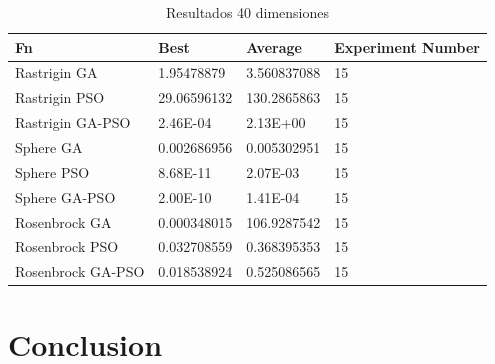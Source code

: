 \documentclass[runningheads]{llncs}
\begin{document}
            \begin{table}[htp]
              \caption{Resultados 40 dimensiones}
              \label{table:resultados-2}
              \centering
              \begin{tabular}{|l|l|l|l|}
              \hline
              Fn & Best & Average & Experiment Number \\
              \hline
              \hline
              Rastrigin GA & 1.95478879 & 3.560837088 & 15\\
              \hline
              Rastrigin PSO & 29.06596132 & 130.2865863 & 15\\
              \hline
              Rastrigin GA-PSO & 2.46E-04 & 2.13E+00 & 15\\
              \hline
              Sphere GA & 0.002686956 & 0.005302951 & 15\\
              \hline
              Sphere PSO & 8.68E-11 & 2.07E-03 & 15\\
              \hline
              Sphere GA-PSO & 2.00E-10 & 1.41E-04 & 15\\
              \hline
              Rosenbrock GA & 0.000348015 & 106.9287542 & 15\\
              \hline
              Rosenbrock PSO & 0.032708559 & 0.368395353 & 15\\
              \hline
              Rosenbrock GA-PSO & 0.018538924 & 0.525086565 & 15\\
              \hline
              \end{tabular}
              \end{table}
%
%
% 
% 
%
\section{Conclusion}
\end{document}
